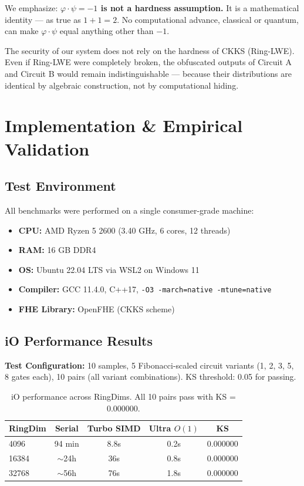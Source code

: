 \documentclass[11pt,a4paper]{article}
\begin{document}
We emphasize: \textbf{$\varphi \cdot \psi = -1$ is not a hardness assumption.} It is a mathematical identity — as true as $1 + 1 = 2$. No computational advance, classical or quantum, can make $\varphi \cdot \psi$ equal anything other than $-1$.

The security of our system does not rely on the hardness of CKKS (Ring-LWE). Even if Ring-LWE were completely broken, the obfuscated outputs of Circuit A and Circuit B would remain indistinguishable — because their distributions are identical by algebraic construction, not by computational hiding.

\section{Implementation \& Empirical Validation}

\subsection{Test Environment}

All benchmarks were performed on a single consumer-grade machine:
\begin{itemize}[nosep]
    \item \textbf{CPU:} AMD Ryzen 5 2600 (3.40 GHz, 6 cores, 12 threads)
    \item \textbf{RAM:} 16 GB DDR4
    \item \textbf{OS:} Ubuntu 22.04 LTS via WSL2 on Windows 11
    \item \textbf{Compiler:} GCC 11.4.0, C++17, \texttt{-O3 -march=native -mtune=native}
    \item \textbf{FHE Library:} OpenFHE (CKKS scheme)
\end{itemize}

\subsection{iO Performance Results}

\textbf{Test Configuration:} 10 samples, 5 Fibonacci-scaled circuit variants (1, 2, 3, 5, 8 gates each), 10 pairs (all variant combinations). KS threshold: 0.05 for passing.

\begin{table}[h]
\centering
\begin{tabular}{lcccc}
\toprule
\textbf{RingDim} & \textbf{Serial} & \textbf{Turbo SIMD} & \textbf{Ultra $O(1)$} & \textbf{KS} \\
\midrule
4096 & 94 min & 8.8s & 0.2s & 0.000000 \\
16384 & $\sim$24h & 36s & 0.8s & 0.000000 \\
32768 & $\sim$56h & 76s & 1.8s & 0.000000 \\
\bottomrule
\end{tabular}
\caption{iO performance across RingDims. All 10 pairs pass with KS = 0.000000.}
\label{tab:perf}
\end{table}
\end{document}
